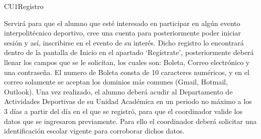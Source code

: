 \begin{UseCase}{CU1}{Registro}{
		Servirá para que el alumno que esté interesado en participar en algún evento interpolitécnico deportivo, cree una cuenta para posteriormente poder iniciar sesión y así, inscribirse en el evento de su interés. 
		Dicho registro lo encontrará dentro de la pantalla de Inicio en el apartado ‘Regístrate’, posteriormente deberá llenar los campos que se le solicitan, los cuales son: Boleta, Correo electrónico y una contraseña.
		El numero de Boleta consta de 10 caracteres numéricos, y en el correo solamente se aceptan los dominios más comunes (Gmail, Hotmail, Outlook).
		Una vez realizado, el alumno deberá acudir al Departamento de Actividades Deportivas de su Unidad Académica en un periodo no máximo a los 3 días a partir del día en el que se registró, para que el coordinador valide los datos que se ingresaron previamente. Para ello el coordinador deberá solicitar una identificación escolar vigente para corroborar dichos datos. 
		
		
	}
\end{UseCase}
